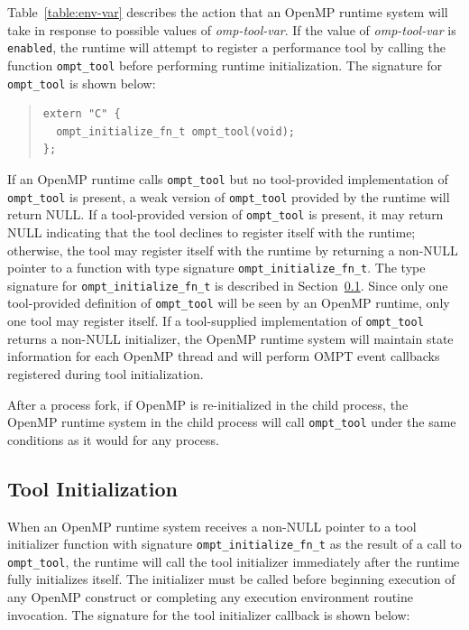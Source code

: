 \documentclass{article}
\begin{document}

\sloppy
Table~\ref{table:env-var} describes the action that an OpenMP runtime system will take in response to possible values of {\em omp-tool-var}.
If the value of {\em omp-tool-var}  is  \verb|enabled|, the runtime will attempt to register  a performance tool by calling the function \verb|ompt_tool| before performing  runtime initialization. The signature for  \verb|ompt_tool|  is shown below:
\begin{quote}
\begin{verbatim}
extern "C" {
  ompt_initialize_fn_t ompt_tool(void);
};
\end{verbatim}
\end{quote}
If an OpenMP runtime calls \verb|ompt_tool| but no tool-provided implementation of \verb|ompt_tool| is present,
a weak version of \verb|ompt_tool| provided by the runtime  will return NULL. If a tool-provided version of \verb|ompt_tool| is present, it may return NULL indicating that the tool declines to register itself with the runtime; otherwise, the tool  may register itself with the runtime by returning a non-NULL pointer to a function with type signature \verb|ompt_initialize_fn_t|. The type signature for \verb|ompt_initialize_fn_t| is described in Section~\ref{sec:init}. 
Since only one tool-provided definition of \verb|ompt_tool| will be seen by an OpenMP runtime, only one tool may register itself. 
If a tool-supplied implementation of \verb|ompt_tool| returns a non-NULL initializer, the OpenMP runtime system will maintain state information for each OpenMP thread and will perform OMPT event callbacks registered during tool initialization. 

After a process fork, if OpenMP is re-initialized in the child process,
the OpenMP runtime system in the child process will call  \verb|ompt_tool| under the same conditions as it would for any process. 

\subsection{Tool Initialization}
\label{sec:init}

When an OpenMP runtime system receives a non-NULL pointer to a tool initializer function with signature \verb|ompt_initialize_fn_t| as the result of a call to  \verb|ompt_tool|, the runtime will call the tool initializer immediately after the runtime fully initializes itself. The initializer must be called before beginning execution of any OpenMP construct or completing any execution environment  routine invocation.  The signature for the tool initializer callback is shown below:
\end{document}
